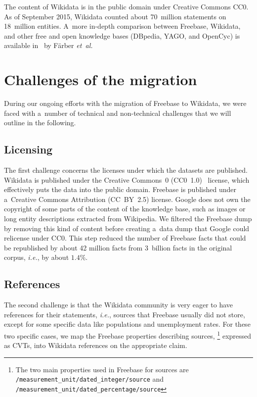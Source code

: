 \documentclass{sig-alternate-2013}
\begin{document}
The content of Wikidata is in the public domain under Creative Commons CC0.
As of September 2015, Wikidata counted about 70~million statements on 18~million entities.
A~more in-depth comparison between Freebase, Wikidata, and other free and open knowledge bases
(DBpedia, YAGO, and OpenCyc) is available in~\cite{farbercomparative} by Färber \emph{et~al.}

\section{Challenges of the migration}\label{sec:challenges-of-the-migration}

During our ongoing efforts with the migration of Freebase to Wikidata,
we were faced with a~number of technical and non-technical challenges
that we will outline in the following.

\subsection{Licensing}
\label{sec:licensing}

The first challenge concerns the licenses under which the datasets are published.
Wikidata is published under the Creative Commons~0 (CC0~1.0)~\cite{cc0} license,
which effectively puts the data into the public domain.
Freebase is published under a~Creative Commons Attribution (CC~BY~2.5) license.
Google does not own the copyright of some parts of the content of the knowledge base,
such as images or long entity descriptions extracted from Wikipedia.
We filtered the Freebase dump by removing this kind of content
before creating a~data dump that Google could relicense under CC0.
This step reduced the number of Freebase facts that could be republished by about 42 million facts
from 3~billion facts in the original corpus, \emph{i.e.}, by about $1.4\%$.

\subsection{References}

The second challenge is that the Wikidata community is very eager to have references
for their statements, \emph{i.e.}, sources that Freebase usually did not store,
except for some specific data like populations and unemployment rates.
For these two specific cases, we map the Freebase properties describing sources,%
\footnote{The two main properties used in Freebase for sources are
\texttt{/measurement\_unit/dated\_integer/source} and
\texttt{/measurement\_unit/dated\_percentage/source}}
expressed as CVTs, into Wikidata references on the appropriate claim.
\end{document}
